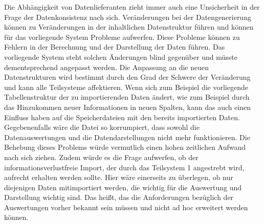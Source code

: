     Die Abhängigkeit von Datenlieferanten zieht immer auch eine Unsicherheit in der Frage der Datenkonsistenz
    nach sich. Veränderungen bei der Datengenerierung können zu Veränderungen in der inhaltlichen Datenstruktur führen und
    können für das vorliegende System Probleme aufwerfen.
    Diese Probleme können zu Fehlern in der Berechnung und der Darstellung der Daten führen. 
    Das vorliegende System steht solchen Änderungen blind gegenüber und müsste dementsprechend angepasst werden. 
    Die Anpassung an die neuen Datenstrukturen wird bestimmt durch den Grad der Schwere der Veränderung und kann alle Teilsysteme affektieren. 
    Wenn sich zum Beispiel die vorliegende Tabellenstruktur der zu importierenden Daten ändert, wie zum Beispiel 
    durch das Hinzukommen neuer Informationen in neuen Spalten, kann das auch einen Einfluss haben 
    auf die Speicherdateien mit den bereits importierten Daten. Gegebenenfalls wäre die Datei so korrumpiert,
    dass sowohl die Datenauswertungen und die Datendarstellungen nicht mehr funktionieren. Die Behebung dieses Problems 
    würde vermutlich einen hohen zeitlichen Aufwand nach sich ziehen. Zudem würde es die Frage aufwerfen, 
    ob der informationsverlustfreie Import, der durch das Teilsystem 1 angestrebt wird, aufrecht erhalten werden sollte.
    Hier wäre einerseits zu überlegen, ob nur diejenigen Daten mitimportiert werden, die wichtig für die Auswertung
    und Darstellung wichtig sind. Das heißt, das die Anforderungen bezüglich der Auswertungen vorher bekannt sein müssen und
    nicht ad hoc erweitert werden können.
 